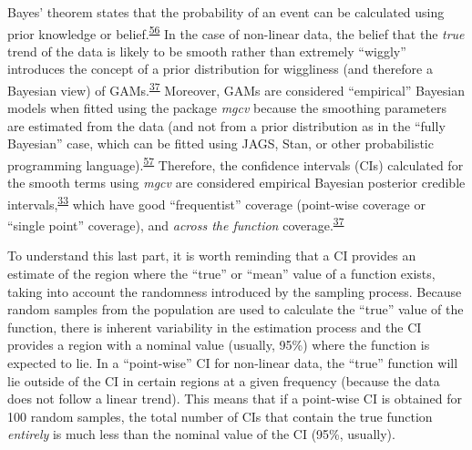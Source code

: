 \documentclass[
]{article}
\begin{document}
Bayes' theorem states that the probability of an event can be calculated using prior knowledge or belief.\textsuperscript{\protect\hyperlink{ref-mcelreath2018}{56}} In the case of non-linear data, the belief that the \emph{true} trend of the data is likely to be smooth rather than extremely ``wiggly'' introduces the concept of a prior distribution for wiggliness (and therefore a Bayesian view) of GAMs.\textsuperscript{\protect\hyperlink{ref-wood2017}{37}} Moreover, GAMs are considered ``empirical'' Bayesian models when fitted using the package \emph{mgcv} because the smoothing parameters are estimated from the data (and not from a prior distribution as in the ``fully Bayesian'' case, which can be fitted using JAGS, Stan, or other probabilistic programming language).\textsuperscript{\protect\hyperlink{ref-miller2019}{57}} Therefore, the confidence intervals (CIs) calculated for the smooth terms using \emph{mgcv} are considered empirical Bayesian posterior credible intervals,\textsuperscript{\protect\hyperlink{ref-pedersen2019}{33}} which have good ``frequentist'' coverage (point-wise coverage or ``single point'' coverage), and \emph{across the function} coverage.\textsuperscript{\protect\hyperlink{ref-wood2017}{37}}

To understand this last part, it is worth reminding that a CI provides an estimate of the region where the ``true'' or ``mean'' value of a function exists, taking into account the randomness introduced by the sampling process. Because random samples from the population are used to calculate the ``true'' value of the function, there is inherent variability in the estimation process and the CI provides a region with a nominal value (usually, 95\%) where the function is expected to lie. In a ``point-wise'' CI for non-linear data, the ``true'' function will lie outside of the CI in certain regions at a given frequency (because the data does not follow a linear trend). This means that if a point-wise CI is obtained for 100 random samples, the total number of CIs that contain the true function \emph{entirely} is much less than the nominal value of the CI (95\%, usually).
\end{document}
